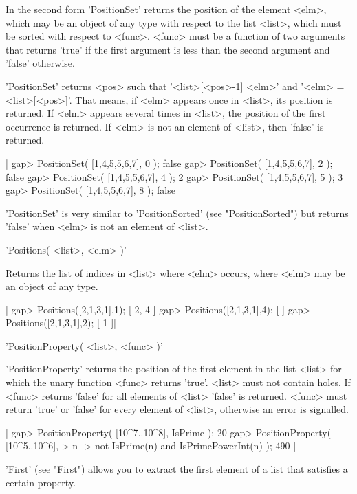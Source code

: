 In the second form 'PositionSet' returns  the position of  the element
<elm>,  which may be  an  object of  any type with   respect to  the list
<list>, which must be sorted with respect  to  <func>.  <func> must  be a
function  of  two arguments that returns 'true'  if the first argument is
less than the second argument and 'false' otherwise.

'PositionSet'  returns <pos>  such  that '<list>[<pos>-1]  \< <elm>'  and
'<elm> = <list>[<pos>]'.  That  means, if <elm>  appears once in  <list>,
its position is returned.  If <elm>  appears several times in <list>, the
position of the first occurrence is returned.  If <elm> is not an element
of <list>, then 'false' is returned.

|    gap> PositionSet( [1,4,5,5,6,7], 0 );
    false
    gap> PositionSet( [1,4,5,5,6,7], 2 );
    false
    gap> PositionSet( [1,4,5,5,6,7], 4 );
    2
    gap> PositionSet( [1,4,5,5,6,7], 5 );
    3
    gap> PositionSet( [1,4,5,5,6,7], 8 );
    false |

'PositionSet'  is very similar to 'PositionSorted' (see "PositionSorted")
but returns 'false' when <elm> is not an element of <list>.

%

'Positions( <list>, <elm> )'

Returns  the list of indices in <list>  where <elm> occurs, where <elm> may
be an object of any type.

|   gap> Positions([2,1,3,1],1);
   [ 2, 4 ]
   gap> Positions([2,1,3,1],4);
   [  ]
   gap> Positions([2,1,3,1],2);
   [ 1 ]|


'PositionProperty( <list>, <func> )'

'PositionProperty' returns the position of the first element in  the list
<list> for which the unary  function <func>  returns 'true'.  <list> must
not contain holes.  If <func> returns 'false' for all elements  of <list>
'false'  is returned.   <func> must  return 'true' or   'false' for every
element of <list>, otherwise an error is signalled.

|    gap> PositionProperty( [10^7..10^8], IsPrime );
    20
    gap> PositionProperty( [10^5..10^6],
    >                      n -> not IsPrime(n) and IsPrimePowerInt(n) );
    490 |

'First' (see "First") allows you to extract the first element of a list
that satisfies a certain property.

